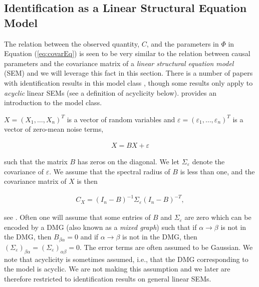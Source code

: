 \documentclass[accepted]{uai2021} %
\begin{document}

\subsection{Identification as a Linear Structural Equation Model}

The relation between the observed quantity, $C$, and the parameters in $\Phi$ 
in 
Equation (\ref{eq:covarEq}) is seen to be very similar to the relation between 
causal parameters and the covariance matrix of a \emph{linear structural 
equation model} (SEM) and we will leverage this fact in this section. There is 
a number of papers with 
identification results in this model class \citep{brito2002, tian2007, 
tian2009, 
foygelHalftrek2012, 
chenNIPS2016, drton2016, 
weihs2018}, though some results only apply to \emph{acyclic} linear SEMs (see a 
definition of acyclicity below). \cite{bollen1989} provides an introduction to 
the model class.

$X = (X_1,\ldots,X_n)^T$ is a vector of random variables and $\varepsilon = 
(\varepsilon_1,\ldots,\varepsilon_n)^T$ is a vector of zero-mean noise terms,

\begin{align}
	X = BX + \varepsilon
	\label{eq:SEM}
\end{align}

such that the matrix $B$ has zeros on the diagonal. We let $\Sigma_\varepsilon$ 
denote the covariance of $\varepsilon$. We assume that the spectral radius of 
$B$ is less than one, and the
covariance matrix of $X$ is then

\begin{align}
C_X = (I_n - B)^{-1}\Sigma_\varepsilon (I_n - B)^{-T},
\label{eq:covSEM}
\end{align}

see \cite{hyttinen2012}. Often one will assume that some entries of $B$ and 
$\Sigma_\varepsilon$ are zero which can be encoded by a DMG (also known as a 
\emph{mixed graph}) such that if 
$\alpha \rightarrow \beta$ is not in the DMG, then $B_{\beta\alpha} = 0$ and if 
$\alpha\rightarrow\beta$ is not in the DMG, then 
$(\Sigma_\varepsilon)_{\beta\alpha} = (\Sigma_\varepsilon)_{\alpha\beta} = 0$. 
The 
error terms are often assumed to be Gaussian. We note that acyclicity is 
sometimes assumed, 
i.e., that the DMG corresponding to the model is 
acyclic. 
We are not making 
this assumption and we later are therefore restricted to identification results 
on general linear SEMs.
\end{document}

